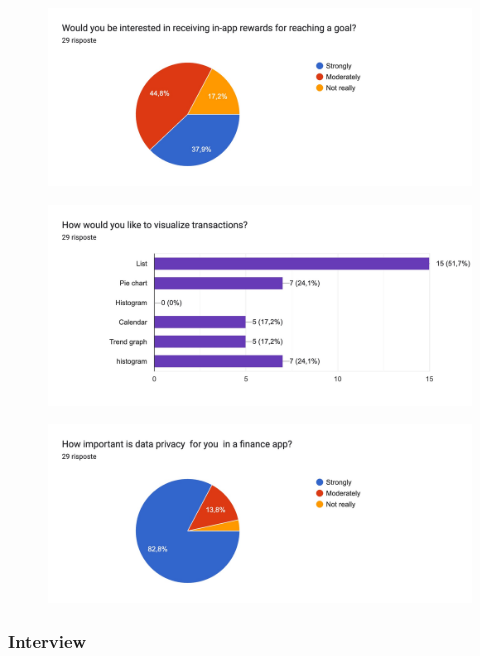\documentclass[a4paper,12pt]{article}
\begin{document}
\begin{figure}[H]
    \centering
    \includegraphics[width=\linewidth]{imagequest6.jpg}
\end{figure}

\begin{figure}[H]
    \centering
    \includegraphics[width=\linewidth]{imagequest7.jpg}
\end{figure}

\begin{figure}[H]
    \centering
    \includegraphics[width=\linewidth]{imagequest8.jpg}
\end{figure}

\subsubsection{Interview}
\end{document}
